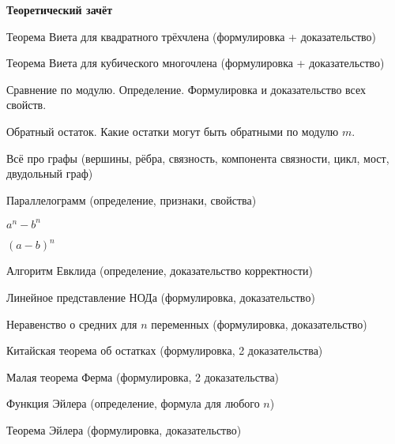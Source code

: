 \documentclass{article}
\begin{document}
    \large

    \begin{center}
        \textbf{Теоретический зачёт}
    \end{center}

    \begin{enumerate_boxed}

        \item Теорема Виета для квадратного трёхчлена (формулировка + доказательство)

        \item Теорема Виета для кубического многочлена (формулировка + доказательство)

        \item Сравнение по модулю.
        Определение.
        Формулировка и доказательство всех свойств.

        \item Обратный остаток.
        Какие остатки могут быть обратными по модулю $m$.

        \item Всё про графы (вершины, рёбра, связность, компонента связности, цикл, мост, двудольный граф)

        \item Параллелограмм (определение, признаки, свойства)

        \item $a^n - b^n$

        \item $(a-b)^n$

        \item Алгоритм Евклида (определение, доказательство корректности)

        \item Линейное представление НОДа (формулировка, доказательство)

        \item Неравенство о средних для $n$ переменных (формулировка, доказательство)

        \item Китайская теорема об остатках (формулировка, 2 доказательства)

        \item Малая теорема Ферма (формулировка, 2 доказательства)

        \item Функция Эйлера (определение, формула для любого $n$)

        \item Теорема Эйлера (формулировка, доказательство)

    \end{enumerate_boxed}
\end{document}
